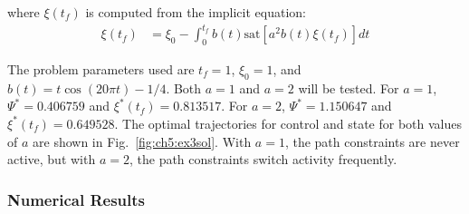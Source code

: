 \noindent where $\xi(t_f)$ is computed from the implicit equation:
\begin{align}
\xi(t_f) &= \xi_0 - \int_0^{t_f} b(t) \mathrm{sat}\left[ a^2 b(t) \xi(t_f) \right] dt 
\end{align}

\noindent The problem parameters used are $t_f = 1$, $\xi_0 = 1$, and $b(t) = t \cos(20 \pi t) - 1/4$.
Both $a = 1$ and $a = 2$ will be tested.
For $a=1$, $\Psi^* = 0.406759$ and $\xi^*(t_f) = 0.813517$.
For $a=2$, $\Psi^* = 1.150647$ and $\xi^*(t_f) = 0.649528$.
The optimal trajectories for control and state for both values of $a$ are shown in Fig.~\ref{fig:ch5:ex3sol}.
With $a=1$, the path constraints are never active, but with $a=2$, the path constraints switch activity frequently. 

\subsubsection{Numerical Results}

